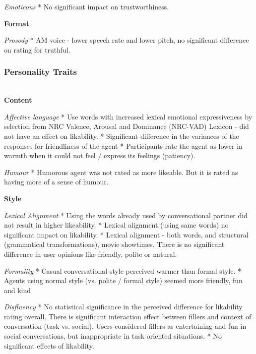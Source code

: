 \documentclass[sigconf,screen,review, anonymous]{acmart}
\newcommand{\cmt}[1]{}%
\begin{document}
\textit{Emoticons}
* No significant impact on trustworthiness. \cite{wilhelm2022keep}\cmt{[28]}

%
\textbf{Format}

\textit{Prosody}
* AM voice - lower speech rate and lower pitch, no significant difference on rating for truthful. \cite{dubiel2020persuasive}\cmt{[60]} 

\subsubsection{Personality Traits \nopunct}
\hfill\\

\textbf{Content}

\textit{Affective language}
* Use words with increased lexical emotional expressiveness by selection from NRC Valence, Arousal and Dominance (NRC-VAD) Lexicon - did not have an effect on likability. \cite{zhu2022effects}\cmt{[26]}
* Significant difference in the variances of the responses for friendliness of the agent \cite{healey2013relating}\cmt{[39]}
* Participants rate the agent as lower in warmth when it could not feel / express its feelings (patiency).  \cite{lee2019s}\cmt{[55]}

\textit{Humour}
* Humorous agent was not rated as more likeable. But it is rated as having more of a sense of humour. \cite{ceha2021can}\cmt{[57]}

%
\textbf{Style}

\textit{Lexical Alignment}
* Using the words already used by conversational partner did not result in higher likeability. \cite{linnemann2018can}\cmt{[15]}
* Lexical alignment (using same words) no significant impact on likability. \cite{huiyang2022improving}\cmt{[17]}
* Lexical alignment - both words, and structural (grammatical transformations), movie showtimes. There is no significant difference in user opinions like friendly, polite or natural. \cite{spillner2021talk}\cmt{[18]}

\textit{Formality}
* Casual conversational style perceived warmer than formal style. \cite{cox2022does}\cmt{[27]}
* Agents using normal style (vs. polite / formal style) seemed more friendly, fun and kind \cite{ouchi2019should}\cmt{[59]}

\textit{Disfluency}
* No statistical significance in the perceived difference for likability rating overall. There is significant interaction effect between fillers and context of conversation (task vs. social). Users considered fillers as entertaining and fun in social conversations, but inappropriate in task oriented situations. \cite{jeong2019exploring}\cmt{[10]}
* No significant effects of likability. \cite{pfeifer2009should}\cmt{[12]}
\end{document}
